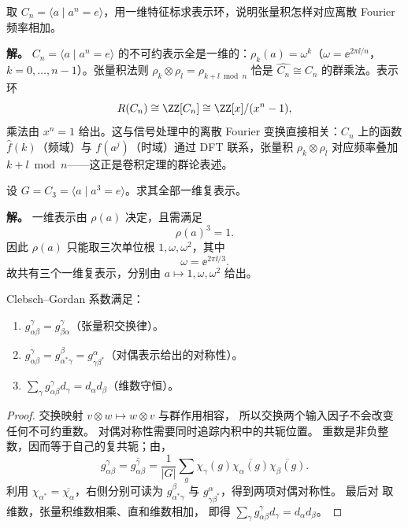 \begin{example}
取 $C_n=\langle a\mid a^n=e\rangle$，用一维特征标求表示环，说明张量积怎样对应离散 Fourier 频率相加。

\textbf{解。} $C_n=\langle a\mid a^n=e\rangle$ 的不可约表示全是一维的：$\rho_k(a)=\omega^k$（$\omega=\ee^{2\pi\ii/n}$，$k=0,\dots,n-1$）。张量积法则 $\rho_k\otimes\rho_l=\rho_{k+l\bmod n}$ 恰是 $\widehat{C_n}\cong C_n$ 的群乘法。表示环
\[
R(C_n)\cong\ZZ[C_n]\cong\ZZ[x]/(x^n-1),
\]
乘法由 $x^n=1$ 给出。这与信号处理中的离散 Fourier 变换直接相关：$C_n$ 上的函数 $\hat f(k)$（频域）与 $f(a^j)$（时域）通过 DFT 联系，张量积 $\rho_k\otimes\rho_l$ 对应频率叠加 $k+l\bmod n$——这正是卷积定理的群论表述。
\end{example}

\begin{workedexample}
设 $G=C_3=\langle a\mid a^3=e\rangle$。求其全部一维复表示。

\textbf{解。} 一维表示由 $\rho(a)$ 决定，且需满足
\[
\rho(a)^3=1.
\]
因此 $\rho(a)$ 只能取三次单位根 $1,\omega,\omega^2$，其中
\[
\omega=\ee^{2\pi \ii/3}.
\]
故共有三个一维复表示，分别由 $a\mapsto 1,\omega,\omega^2$ 给出。
\end{workedexample}


\begin{proposition}
\label{prop:cg-symmetry}
Clebsch--Gordan 系数满足：
\begin{enumerate}[label=(\roman*),leftmargin=3em]
\item $g_{\alpha\beta}^\gamma=g_{\beta\alpha}^\gamma$（张量积交换律）。
\item $g_{\alpha\beta}^\gamma=g_{\alpha^*\gamma}^\beta=g_{\gamma\beta^*}^\alpha$（对偶表示给出的对称性）。
\item $\sum_\gamma g_{\alpha\beta}^\gamma d_\gamma=d_\alpha d_\beta$（维数守恒）。
\end{enumerate}
\end{proposition}

\begin{proof}
交换映射 $v\otimes w\mapsto w\otimes v$ 与群作用相容，
所以交换两个输入因子不会改变任何不可约重数。
对偶对称性需要同时追踪内积中的共轭位置。
重数是非负整数，因而等于自己的复共轭；由，
\[
g_{\alpha\beta}^\gamma
=\overline{g_{\alpha\beta}^\gamma}
=\frac1{|G|}\sum_g\chi_\gamma(g)\overline{\chi_\alpha(g)}\overline{\chi_\beta(g)}.
\]
利用 $\chi_{\alpha^*}=\overline{\chi_\alpha}$，右侧分别可读为
$g_{\alpha^*\gamma}^\beta$ 与 $g_{\gamma\beta^*}^\alpha$，得到两项对偶对称性。
最后对 取维数，张量积维数相乘、直和维数相加，
即得 $\sum_\gamma g_{\alpha\beta}^\gamma d_\gamma=d_\alpha d_\beta$。
\end{proof}

